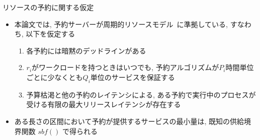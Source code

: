 \begin{frame}{リソースの予約に関する仮定}
    \begin{itemize}
        \item 本論文では, 予約サーバーが周期的リソースモデル~\cite{shin2003periodic}に準拠している, すなわち, 以下を仮定する
              \begin{enumerate}
                  \item 各予約には暗黙のデッドラインがある
                  \item $r_i$がワークロードを持つときはいつでも, 予約アルゴリズムが$P_i$時間単位ごとに少なくとも$Q_i$単位のサービスを保証する
                  \item 予算枯渇と他の予約のレイテンシによる, ある予約で実行中のプロセスが受ける有限の最大リリースレイテンシが存在する
              \end{enumerate}
        \item ある長さの区間において予約が提供するサービスの最小量は, 既知の供給境界関数 $sbf()$ \cite{shin2003periodic, lipari2003resource} で得られる
    \end{itemize}
\end{frame}




